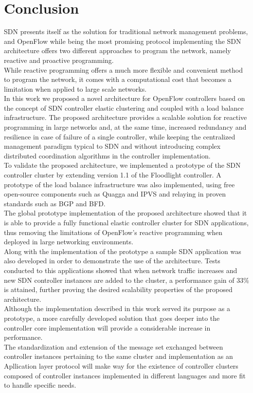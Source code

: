 
\chapter{Conclusion}
\label{chapter:conclusion}
\gls{SDN} presents itself as the solution for traditional network management problems, and OpenFlow while being the most promising protocol implementing the \gls{SDN} architecture offers two different approaches to program the network, namely reactive and proactive programming.\\
While reactive programming offers a much more flexible and convenient method to program the network, it comes with a computational cost that becomes a limitation when applied to large scale networks.\\
In this work we proposed a novel architecture for OpenFlow controllers based on the concept of SDN controller elastic clustering and coupled with a load balance infrastructure.
The proposed architecture provides a scalable solution for reactive programming in large networks and, at the same time, increased redundancy and resilience in case of failure of a single controller, while keeping the centralized management paradigm typical to \gls{SDN} and without introducing complex distributed coordination algorithms in the controller implementation.\\
To validate the proposed architecture, we implemented a prototype of the \gls{SDN} controller cluster by extending version 1.1 of the Floodlight controller.
A prototype of the load balance infrastructure was also implemented, using free open-source components such as Quagga and \gls{IPVS} and relaying in proven standards such as \gls{BGP} and \gls{BFD}.\\
%
The global prototype implementation of the proposed architecture showed that it is able to provide a fully functional elastic controller cluster for \gls{SDN} applications, thus removing the limitations of OpenFlow's reactive programming when deployed in large networking environments.\\
%
Along with the implementation of the prototype a sample \gls{SDN} application was also developed in order to demonstrate the use of the architecture.
Tests conducted to this applications showed that when network traffic increases and new \gls{SDN} controller instances are added to the cluster, a performance gain of 33$\%$ is attained, further proving the desired scalability properties of the proposed architecture.\\
%
Although the implementation described in this work served its purpose as a prototype, a more carefully developed solution that goes deeper into the controller core implementation will provide a considerable increase in performance.\\
%
The standardization and extension of the message set exchanged between controller instances pertaining to the same cluster and implementation as an Apllication layer protocol will make way for the existence of controller clusters composed of controller instances implemented in different languages and more fit to handle specific needs.
